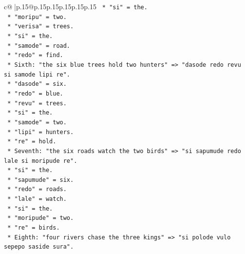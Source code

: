 \documentclass{article}
\begin{document}
{\begin{supertabular}{c@{$\;$}|p{.15\linewidth}@{}p{.15\linewidth}p{.15\linewidth}p{.15\linewidth}p{.15\linewidth}p{.15\linewidth}}
{{{\texttt{                                    *   "si" = the.} \\
\texttt{                                    *   "moripu" = two.} \\
\texttt{                                    *   "verisa" = trees.} \\
\texttt{                                    *   "si" = the.} \\
\texttt{                                    *   "samode" = road.} \\
\texttt{                                    *   "redo" = find.} \\
\texttt{                                *   Sixth: "the six blue trees hold two hunters" => "dasode redo revu si samode lipi re".} \\
\texttt{                                    *   "dasode" = six.} \\
\texttt{                                    *   "redo" = blue.} \\
\texttt{                                    *   "revu" = trees.} \\
\texttt{                                    *   "si" = the.} \\
\texttt{                                    *   "samode" = two.} \\
\texttt{                                    *   "lipi" = hunters.} \\
\texttt{                                    *   "re" = hold.} \\
\texttt{                                *   Seventh: "the six roads watch the two birds" => "si sapumude redo lale si moripude re".} \\
\texttt{                                    *   "si" = the.} \\
\texttt{                                    *   "sapumude" = six.} \\
\texttt{                                    *   "redo" = roads.} \\
\texttt{                                    *   "lale" = watch.} \\
\texttt{                                    *   "si" = the.} \\
\texttt{                                    *   "moripude" = two.} \\
\texttt{                                    *   "re" = birds.} \\
\texttt{                                *   Eighth: "four rivers chase the three kings" => "si polode vulo sepepo saside sura".} \\
}}}
\end{supertabular}}
\end{document}
